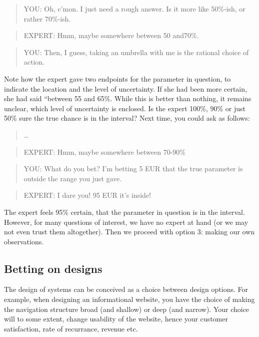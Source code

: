 \documentclass[]{svmono}
\theoremstyle{definition}
\theoremstyle{definition}
\theoremstyle{definition}
\theoremstyle{remark}
\begin{document}
\begin{quote}
YOU: Oh, c'mon. I just need a rough answer. Is it more like 50\%-ish, or
rather 70\%-ish.
\end{quote}

\begin{quote}
EXPERT: Hmm, maybe somewhere between 50 and70\%.
\end{quote}

\begin{quote}
YOU: Then, I guess, taking an umbrella with me is the rational choice of
action.
\end{quote}

Note how the expert gave two endpoints for the parameter in question, to
indicate the location and the level of uncertainty. If she had been more
certain, she had said ``between 55 and 65\%. While this is better than
nothing, it remains unclear, which level of uncertainty is enclosed. Is
the expert 100\%, 90\% or just 50\% sure the true chance is in the
interval? Next time, you could ask as follows:

\begin{quote}
\ldots{}
\end{quote}

\begin{quote}
EXPERT: Hmm, maybe somewhere between 70-90\%
\end{quote}

\begin{quote}
YOU: What do you bet? I'm betting 5 EUR that the true parameter is
outside the range you just gave.
\end{quote}

\begin{quote}
EXPERT: I dare you! 95 EUR it's inside!
\end{quote}

The expert feels 95\% certain, that the parameter in question is in the
interval. However, for many questions of interest, we have no expert at
hand (or we may not even trust them altogether). Then we proceed with
option 3: making our own observations.

\subsection{Betting on designs}\label{betting-on-designs}

The design of systems can be conceived as a choice between design
options. For example, when designing an informational website, you have
the choice of making the navigation structure broad (and shallow) or
deep (and narrow). Your choice will to some extent, change usability of
the website, hence your customer satisfaction, rate of recurrance,
revenue etc.
\end{document}
